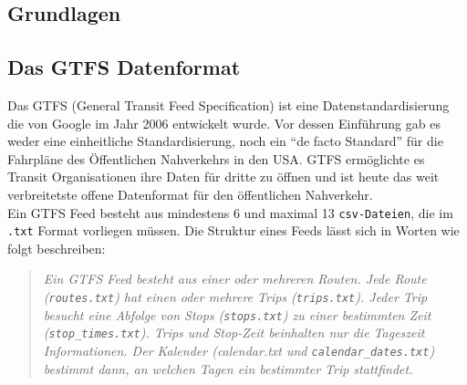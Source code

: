 
\begin{newpage}
	
	\section{Grundlagen}
	\label{sec:Grundlagen}

	\subsection{Das GTFS Datenformat}
	\label{ssec:das_gtfs_datenformat}
		Das GTFS (General Transit Feed Specification) ist eine Datenstandardisierung die von Google im Jahr 2006 entwickelt wurde. Vor dessen Einführung gab es weder eine einheitliche Standardisierung, noch ein "`de facto Standard"' für die Fahrpläne des Öffentlichen Nahverkehrs in den USA. GTFS ermöglichte es Transit Organisationen ihre Daten für dritte zu öffnen und ist heute das weit verbreitetste offene Datenformat für den öffentlichen Nahverkehr.\parencite[S. 2]{roush}\\

    Ein GTFS Feed besteht aus mindestens 6 und maximal 13 \texttt{csv-Dateien}, die im \texttt{.txt} Format vorliegen müssen. Die Struktur eines Feeds lässt sich in Worten wie folgt beschreiben:

    \begin{quote}
      \textit{Ein GTFS Feed besteht aus einer oder mehreren Routen. Jede Route (\texttt{routes.txt}) hat einen oder mehrere Trips (\texttt{trips.txt}). Jeder Trip besucht eine Abfolge von Stops (\texttt{stops.txt}) zu einer bestimmten Zeit (\texttt{stop\_times.txt}). Trips und Stop-Zeit beinhalten nur die Tageszeit Informationen. Der Kalender (calendar.txt und \texttt{calendar\_dates.txt}) bestimmt dann, an welchen Tagen ein bestimmter Trip stattfindet.} \parencite[S. 8]{zervaas}
    \end{quote}


\end{newpage}
